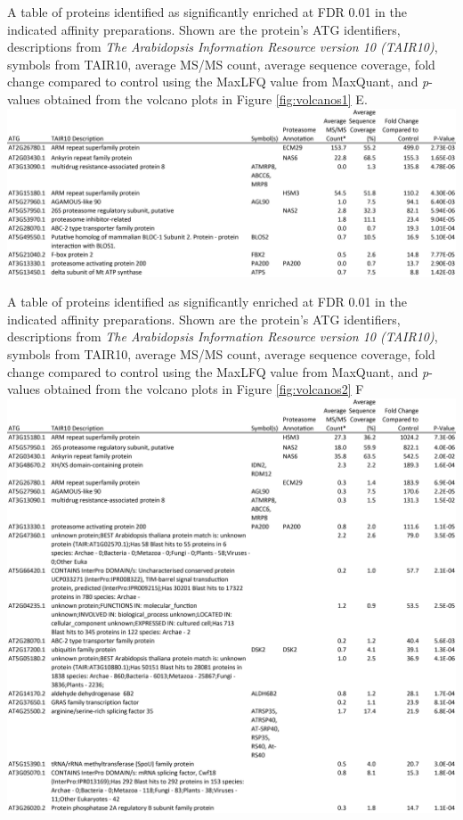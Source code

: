 \begin{table}
	{A table of proteins identified as significantly enriched at FDR 0.01 in the indicated affinity preparations.  Shown are the protein's ATG identifiers, descriptions from \textit{The Arabidopsis Information Resource version 10 (TAIR10)}, symbols from TAIR10, average MS/MS count, average sequence coverage, fold change compared to control using the MaxLFQ value from MaxQuant, and \textit{p}-values obtained from the volcano plots in Figure \ref{fig:volcanos1} E.}
\includegraphics[width=\columnwidth]{Proteasome/rpt4aminus.png}
\label{table:rpt4bminus}
\end{table}
\clearpage

\begin{table}
	{A table of proteins identified as significantly enriched at FDR 0.01 in the indicated affinity preparations.  Shown are the protein's ATG identifiers, descriptions from \textit{The Arabidopsis Information Resource version 10 (TAIR10)}, symbols from TAIR10, average MS/MS count, average sequence coverage, fold change compared to control using the MaxLFQ value from MaxQuant, and \textit{p}-values obtained from the volcano plots in Figure \ref{fig:volcanos2} F}
\includegraphics[width=\columnwidth]{Proteasome/rpt4aplus.png}
\label{table:rpt4bplus}
\end{table}
\clearpage

